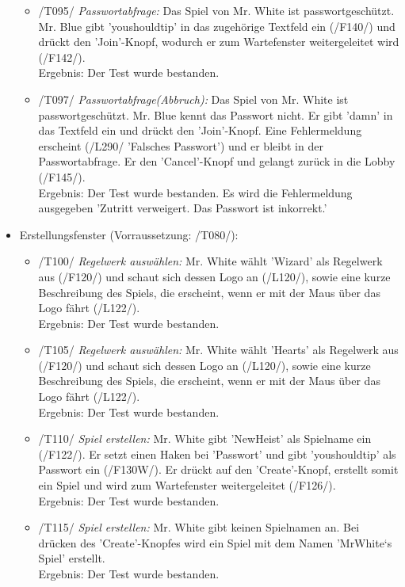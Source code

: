 \documentclass[a4paper]{article}
\begin{document}
\begin{itemize}
\begin{itemize}
		\item /T095/ \textit{Passwortabfrage:} Das Spiel von Mr. White ist passwortgeschützt. Mr. Blue gibt 'youshouldtip' in 		das zugehörige Textfeld ein (/F140/) und drückt den 'Join'-Knopf, wodurch er zum Wartefenster weitergeleitet 			wird (/F142/).  \\
		Ergebnis: Der Test wurde bestanden.

		\item /T097/ \textit{Passwortabfrage(Abbruch):} Das Spiel von Mr. White ist passwortgeschützt. Mr. Blue kennt das 			Passwort nicht. Er gibt 'damn' in das Textfeld ein und drückt den 'Join'-Knopf. Eine Fehlermeldung erscheint (/L290/ 			'Falsches Passwort') und er bleibt in der Passwortabfrage. Er den 'Cancel'-Knopf und gelangt zurück in die 					Lobby (/F145/). \\
		Ergebnis: Der Test wurde bestanden. Es wird die Fehlermeldung ausgegeben 'Zutritt verweigert. Das Passwort ist 			inkorrekt.'
			  
	\end{itemize}
	\item Erstellungsfenster (Vorraussetzung: /T080/): 
	\begin{itemize}
	
		\item /T100/ \textit{Regelwerk auswählen:} Mr. White wählt 'Wizard' als Regelwerk aus (/F120/) und 				schaut sich dessen Logo an (/L120/), sowie eine kurze Beschreibung des Spiels, die erscheint, wenn er mit der Maus 			über das Logo fährt (/L122/). \\
		Ergebnis: Der Test wurde bestanden.
		
		\item /T105/ \textit{Regelwerk auswählen:} Mr. White wählt 'Hearts' als Regelwerk aus (/F120/) und 				schaut sich dessen Logo an (/L120/), sowie eine kurze Beschreibung des Spiels, die erscheint, wenn er mit der Maus 			über das Logo fährt (/L122/). \\
		Ergebnis: Der Test wurde bestanden.
		
		\item /T110/ \textit{Spiel erstellen:} Mr. White gibt 'NewHeist' als Spielname ein (/F122/). Er setzt einen Haken bei 			'Passwort' und gibt 'youshouldtip' als Passwort ein (/F130W/). Er drückt auf den 'Create'-Knopf, erstellt somit ein 				Spiel und wird zum Wartefenster weitergeleitet (/F126/). \\
		Ergebnis: Der Test wurde bestanden.
		
		\item /T115/ \textit{Spiel erstellen:} Mr. White gibt keinen Spielnamen an. Bei drücken des 'Create'-Knopfes wird ein 			Spiel mit dem Namen 'MrWhite`s Spiel' erstellt. \\
		Ergebnis: Der Test wurde bestanden.
		

\end{itemize}
\end{itemize}
\end{document}
